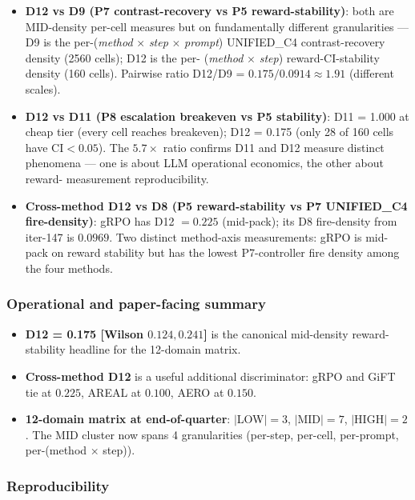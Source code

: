 \documentclass{article}
\begin{document}
\begin{itemize}
\item \textbf{D12 vs D9 (P7 contrast-recovery vs P5 reward-stability)}:
  both are MID-density per-cell measures but on fundamentally different
  granularities --- D9 is the per-(\textit{method} $\times$ \textit{step} $\times$ \textit{prompt})
  UNIFIED\_C4 contrast-recovery density (2560 cells); D12 is the per-
  (\textit{method} $\times$ \textit{step}) reward-CI-stability density (160
  cells).  Pairwise ratio D12/D9 = $0.175 / 0.0914 \approx 1.91$
  (different scales).
\item \textbf{D12 vs D11 (P8 escalation breakeven vs P5 stability)}:
  D11 = 1.000 at cheap tier (every cell reaches breakeven);
  D12 = 0.175 (only 28 of 160 cells have $\text{CI} < 0.05$).  The
  $5.7\times$ ratio confirms D11 and D12 measure distinct phenomena ---
  one is about LLM operational economics, the other about reward-
  measurement reproducibility.
\item \textbf{Cross-method D12 vs D8 (P5 reward-stability vs P7
  UNIFIED\_C4 fire-density)}: gRPO has D12 $= 0.225$ (mid-pack); its
  D8 fire-density from iter-147 is $0.0969$.  Two distinct
  method-axis measurements: gRPO is mid-pack on reward stability
  but has the lowest P7-controller fire density among the four
  methods.
\end{itemize}

\subsubsection{Operational and paper-facing summary}

\begin{itemize}
\item \textbf{D12 = 0.175 [Wilson $0.124, 0.241$]} is the canonical
mid-density reward-stability headline for the 12-domain matrix.
\item \textbf{Cross-method D12} is a useful additional discriminator:
  gRPO and GiFT tie at $0.225$, AREAL at $0.100$, AERO at $0.150$.
\item \textbf{12-domain matrix at end-of-quarter}: $|$LOW$| = 3$,
  $|$MID$| = 7$, $|$HIGH$| = 2$.  The MID cluster now spans 4
  granularities (per-step, per-cell, per-prompt, per-(method × step)).
\end{itemize}

\subsubsection{Reproducibility}
\end{document}
